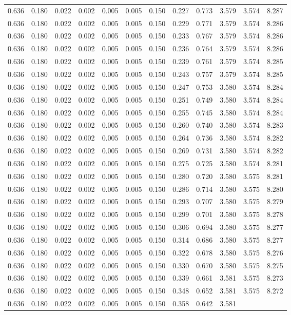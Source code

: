 \begin{longtable}{rrrrrrrrrrrr}
    0.636 & 0.180 & 0.022 & 0.002 & 0.005 & 0.005 & 0.150 & 0.227 & 0.773 & 3.579 & 3.574 & 8.287 \\0.636 & 0.180 & 0.022 & 0.002 & 0.005 & 0.005 & 0.150 & 0.229 & 0.771 & 3.579 & 3.574 & 8.286 \\0.636 & 0.180 & 0.022 & 0.002 & 0.005 & 0.005 & 0.150 & 0.233 & 0.767 & 3.579 & 3.574 & 8.286 \\0.636 & 0.180 & 0.022 & 0.002 & 0.005 & 0.005 & 0.150 & 0.236 & 0.764 & 3.579 & 3.574 & 8.286 \\0.636 & 0.180 & 0.022 & 0.002 & 0.005 & 0.005 & 0.150 & 0.239 & 0.761 & 3.579 & 3.574 & 8.285 \\0.636 & 0.180 & 0.022 & 0.002 & 0.005 & 0.005 & 0.150 & 0.243 & 0.757 & 3.579 & 3.574 & 8.285 \\0.636 & 0.180 & 0.022 & 0.002 & 0.005 & 0.005 & 0.150 & 0.247 & 0.753 & 3.580 & 3.574 & 8.284 \\0.636 & 0.180 & 0.022 & 0.002 & 0.005 & 0.005 & 0.150 & 0.251 & 0.749 & 3.580 & 3.574 & 8.284 \\0.636 & 0.180 & 0.022 & 0.002 & 0.005 & 0.005 & 0.150 & 0.255 & 0.745 & 3.580 & 3.574 & 8.284 \\0.636 & 0.180 & 0.022 & 0.002 & 0.005 & 0.005 & 0.150 & 0.260 & 0.740 & 3.580 & 3.574 & 8.283 \\0.636 & 0.180 & 0.022 & 0.002 & 0.005 & 0.005 & 0.150 & 0.264 & 0.736 & 3.580 & 3.574 & 8.282 \\0.636 & 0.180 & 0.022 & 0.002 & 0.005 & 0.005 & 0.150 & 0.269 & 0.731 & 3.580 & 3.574 & 8.282 \\0.636 & 0.180 & 0.022 & 0.002 & 0.005 & 0.005 & 0.150 & 0.275 & 0.725 & 3.580 & 3.574 & 8.281 \\0.636 & 0.180 & 0.022 & 0.002 & 0.005 & 0.005 & 0.150 & 0.280 & 0.720 & 3.580 & 3.575 & 8.281 \\0.636 & 0.180 & 0.022 & 0.002 & 0.005 & 0.005 & 0.150 & 0.286 & 0.714 & 3.580 & 3.575 & 8.280 \\0.636 & 0.180 & 0.022 & 0.002 & 0.005 & 0.005 & 0.150 & 0.293 & 0.707 & 3.580 & 3.575 & 8.279 \\0.636 & 0.180 & 0.022 & 0.002 & 0.005 & 0.005 & 0.150 & 0.299 & 0.701 & 3.580 & 3.575 & 8.278 \\0.636 & 0.180 & 0.022 & 0.002 & 0.005 & 0.005 & 0.150 & 0.306 & 0.694 & 3.580 & 3.575 & 8.277 \\0.636 & 0.180 & 0.022 & 0.002 & 0.005 & 0.005 & 0.150 & 0.314 & 0.686 & 3.580 & 3.575 & 8.277 \\0.636 & 0.180 & 0.022 & 0.002 & 0.005 & 0.005 & 0.150 & 0.322 & 0.678 & 3.580 & 3.575 & 8.276 \\0.636 & 0.180 & 0.022 & 0.002 & 0.005 & 0.005 & 0.150 & 0.330 & 0.670 & 3.580 & 3.575 & 8.275 \\0.636 & 0.180 & 0.022 & 0.002 & 0.005 & 0.005 & 0.150 & 0.339 & 0.661 & 3.581 & 3.575 & 8.273 \\0.636 & 0.180 & 0.022 & 0.002 & 0.005 & 0.005 & 0.150 & 0.348 & 0.652 & 3.581 & 3.575 & 8.272 \\0.636 & 0.180 & 0.022 & 0.002 & 0.005 & 0.005 & 0.150 & 0.358 & 0.642 & 3.581 & 
\end{longtable}
